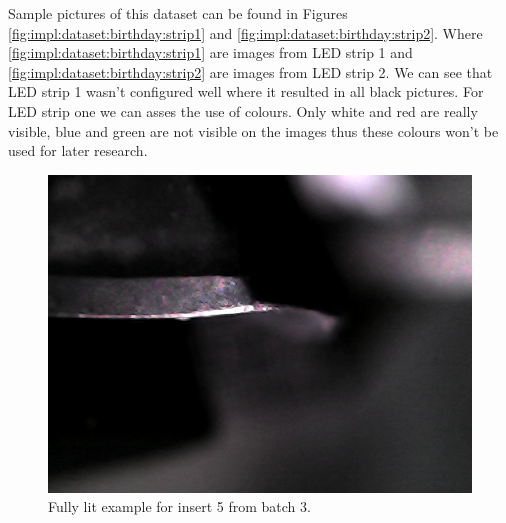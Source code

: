 			Sample pictures of this dataset can be found in Figures \ref{fig:impl:dataset:birthday:strip1} and \ref{fig:impl:dataset:birthday:strip2}. Where \ref{fig:impl:dataset:birthday:strip1} are images from LED strip 1 and \ref{fig:impl:dataset:birthday:strip2} are images from LED strip 2. We can see that LED strip 1 wasn't configured well where it resulted in all black pictures. For LED strip one we can asses the use of colours. Only white and red are really visible, blue and green are not visible on the images thus these colours won't be used for later research.



			\begin{figure}[hbtp]
				\centering
				\includegraphics[width=.3\textwidth, keepaspectratio=true]{./fig/Vision/Dataset/automated_datasets/2_created_datasets/1_Birthday_dataset/b_003_p_005_l_000_b.png}
				\caption{Fully lit example for insert 5 from batch 3.}
			\end{figure}

